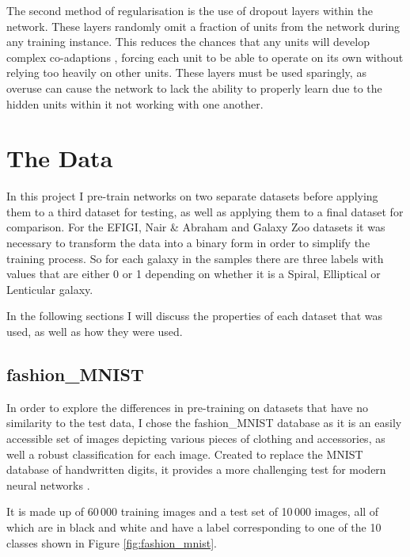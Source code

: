 \documentclass[12pt, onecolumn]{aa}
\begin{document}
The second method of regularisation is the use of dropout layers within the network. These layers randomly omit a fraction of units from the network during any training instance. This reduces the chances that any units will develop complex co-adaptions \citep{HintonG2012}, forcing each unit to be able to operate on its own without relying too heavily on other units. These layers must be used sparingly, as overuse can cause the network to lack the ability to properly learn due to the hidden units within it not working with one another. 
\newpage
\section{The Data}\label{sec:data}
In this project I pre-train networks on two separate datasets before applying them to a third dataset for testing, as well as applying them to a final dataset for comparison. For the EFIGI, Nair \& Abraham and Galaxy Zoo datasets it was necessary to transform the data into a binary form in order to simplify the training process. So for each galaxy in the samples there are three labels with values that are either 0 or 1 depending on whether it is a Spiral, Elliptical or Lenticular galaxy.

In the following sections I will discuss the properties of each dataset that was used, as well as how they were used.
\subsection{fashion\_MNIST }\label{sec:fmnistdata}
In order to explore the differences in pre-training on datasets that have no similarity to the test data, I chose the fashion\_MNIST database as it is an easily accessible set of images depicting various pieces of clothing and accessories, as well a robust classification for each image. Created to replace the MNIST database of handwritten digits, it provides a more challenging test for modern neural networks \citep{fashion_mnist}.


It is made up of 60\,000 training images and a test set of 10\,000 images, all of which are in black and white and have a label corresponding to one of the 10 classes shown in Figure \ref{fig:fashion_mnist}. 
\end{document}
